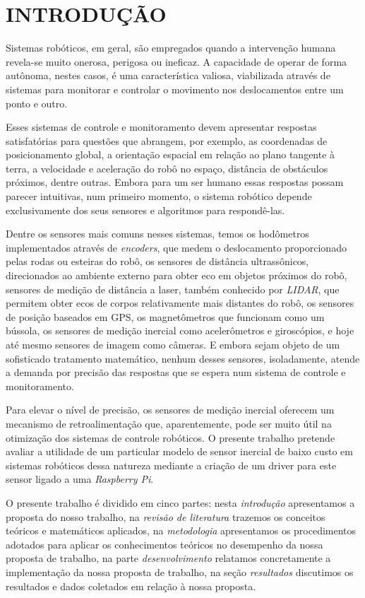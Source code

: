 \chapter*{INTRODUÇÃO\hfill}\label{chap:introducao}

Sistemas robóticos, em geral, são empregados quando a intervenção humana
revela-se muito onerosa, perigosa ou ineficaz. A capacidade de operar de forma
autônoma, nestes casos, é uma característica valiosa, viabilizada através de
sistemas para monitorar e controlar o movimento nos deslocamentos entre um
ponto e outro.

Esses sistemas de controle e monitoramento devem apresentar respostas
satisfatórias para questões que abrangem, por exemplo, as coordenadas de
posicionamento global, a orientação espacial em relação ao plano tangente à
terra, a velocidade e aceleração do robô no espaço, distância de obstáculos
próximos, dentre outras. Embora para um ser humano essas respostas possam
parecer intuitivas, num primeiro momento, o sistema robótico depende
exclusivamente dos seus sensores e algoritmos para respondê-las.

Dentre os sensores mais comuns nesses sistemas, temos os hodômetros
implementados através de \emph{encoders}, que medem o deslocamento
proporcionado pelas rodas ou esteiras do robô, os sensores de distância
ultrassônicos, direcionados ao ambiente externo para obter eco em objetos
próximos do robô, sensores de medição de distância a laser, também conhecido
por \emph{LIDAR}, que permitem obter ecos de corpos relativamente mais
distantes do robô, os sensores de posição baseados em GPS, os magnetômetros que
funcionam como um bússola, os sensores de medição inercial como acelerômetros e
giroscópios, e hoje até mesmo sensores de imagem como câmeras. E embora sejam
objeto de um sofisticado tratamento matemático, nenhum desses sensores,
isoladamente, atende a demanda por precisão das respostas que se espera num
sistema de controle e monitoramento.

Para elevar o nível de precisão, os sensores de medição inercial oferecem um
mecanismo de retroalimentação que, aparentemente, pode ser muito útil na
otimização dos sistemas de controle robóticos. O presente trabalho pretende
avaliar a utilidade de um particular modelo de sensor inercial de baixo custo
em sistemas robóticos dessa natureza mediante a criação de um driver para este
sensor ligado a uma \emph{Raspberry Pi}.

O presente trabalho é dividido em cinco partes: nesta \emph{introdução} apresentamos a proposta do nosso trabalho, na \emph{revisão de literatura} trazemos os conceitos teóricos e matemáticos aplicados, na \emph{metodologia} apresentamos os procedimentos adotados para aplicar os conhecimentos teóricos no desempenho da nossa proposta de trabalho, na parte \emph{desenvolvimento} relatamos concretamente a implementação da nossa proposta de trabalho, na seção \emph{resultados} discutimos os resultados e dados coletados em relação à nossa proposta.
